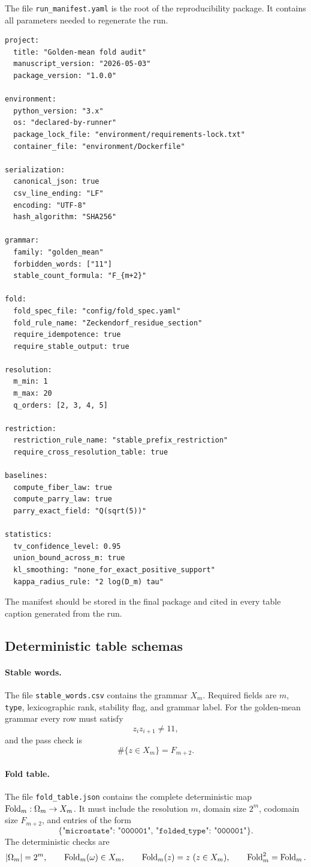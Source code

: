The file \texttt{run\_manifest.yaml} is the root of the reproducibility package.  It contains all parameters needed to regenerate the run.
\begin{verbatim}
project:
  title: "Golden-mean fold audit"
  manuscript_version: "2026-05-03"
  package_version: "1.0.0"

environment:
  python_version: "3.x"
  os: "declared-by-runner"
  package_lock_file: "environment/requirements-lock.txt"
  container_file: "environment/Dockerfile"

serialization:
  canonical_json: true
  csv_line_ending: "LF"
  encoding: "UTF-8"
  hash_algorithm: "SHA256"

grammar:
  family: "golden_mean"
  forbidden_words: ["11"]
  stable_count_formula: "F_{m+2}"

fold:
  fold_spec_file: "config/fold_spec.yaml"
  fold_rule_name: "Zeckendorf_residue_section"
  require_idempotence: true
  require_stable_output: true

resolution:
  m_min: 1
  m_max: 20
  q_orders: [2, 3, 4, 5]

restriction:
  restriction_rule_name: "stable_prefix_restriction"
  require_cross_resolution_table: true

baselines:
  compute_fiber_law: true
  compute_parry_law: true
  parry_exact_field: "Q(sqrt(5))"

statistics:
  tv_confidence_level: 0.95
  union_bound_across_m: true
  kl_smoothing: "none_for_exact_positive_support"
  kappa_radius_rule: "2 log(D_m) tau"
\end{verbatim}
The manifest should be stored in the final package and cited in every table caption generated from the run.

\subsection{Deterministic table schemas}

\paragraph{Stable words.}
The file \texttt{stable\_words.csv} contains the grammar \(X_m\).  Required fields are \(m\), \texttt{type}, lexicographic rank, stability flag, and grammar label.  For the golden-mean grammar every row must satisfy
\[
z_i z_{i+1}\ne 11,
\]
and the pass check is
\[
\#\{z\in X_m\}=F_{m+2}.
\]

\paragraph{Fold table.}
The file \texttt{fold\_table.json} contains the complete deterministic map \(\operatorname{Fold}_m:\Omega_m\to X_m\).  It must include the resolution \(m\), domain size \(2^m\), codomain size \(F_{m+2}\), and entries of the form
\[
\texttt{\{"microstate": "000001", "folded\_type": "000001"\}}.
\]
The deterministic checks are
\[
\left|\Omega_m\right|=2^m,\qquad
\operatorname{Fold}_m(\omega)\in X_m,\qquad
\operatorname{Fold}_m(z)=z\ (z\in X_m),\qquad
\operatorname{Fold}_m^2=\operatorname{Fold}_m.
\]


